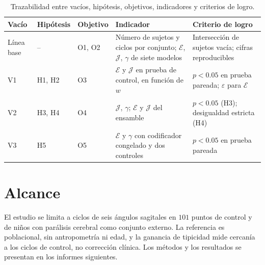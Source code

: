 \documentclass[11pt,a4paper]{article}
\begin{document}
\begin{table}[h]
\centering\footnotesize
\setlength{\tabcolsep}{3pt}
\begin{tabularx}{\textwidth}{@{}>{\raggedright\arraybackslash}p{1.6cm}>{\raggedright\arraybackslash}p{1.3cm}>{\raggedright\arraybackslash}p{1.1cm}>{\raggedright\arraybackslash}X>{\raggedright\arraybackslash}p{4.0cm}@{}}
\toprule
Vacío & Hipótesis & Objetivo & Indicador & Criterio de logro \\
\midrule
Línea base & -- & O1, O2 & Número de sujetos y ciclos por conjunto; $\mathcal E$, $\mathcal J$, $\gamma$ de siete modelos & Intersección de sujetos vacía; cifras reproducibles \\
V1 & H1, H2 & O3 & $\mathcal E$ y $\mathcal J$ en prueba de control, en función de $w$ & $p<0.05$ en prueba pareada; $\varepsilon$ para $\mathcal E$ \\
V2 & H3, H4 & O4 & $\mathcal J$, $\gamma$; $\mathcal E$ y $\mathcal J$ del ensamble & $p<0.05$ (H3); desigualdad estricta (H4) \\
V3 & H5 & O5 & $\mathcal E$ y $\gamma$ con codificador congelado y dos controles & $p<0.05$ en prueba pareada \\
\bottomrule
\end{tabularx}
\caption{Trazabilidad entre vacíos, hipótesis, objetivos, indicadores y criterios de logro.}
\label{tab:trazabilidad}
\end{table}

\section{Alcance}

El estudio se limita a ciclos de seis ángulos sagitales en $101$ puntos de control y de niños con parálisis cerebral como conjunto externo. La referencia es poblacional, sin antropometría ni edad, y la ganancia de tipicidad mide cercanía a los ciclos de control, no corrección clínica. Los métodos y los resultados se presentan en los informes siguientes.
\end{document}
